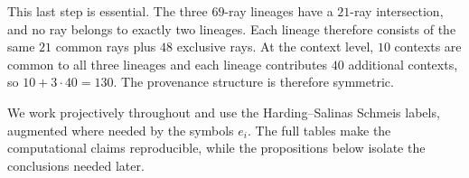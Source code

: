 \documentclass[%
  reprint,
  superscriptaddress,
  showpacs,
  showkeys,
  amsmath,amssymb,
  pra,
  longbibliography,
  floatfix,
  x11names
]{revtex4-2}
\newenvironment{revision}{\begingroup}{\endgroup}
\begin{document}
\begin{revision}
This last step is essential.  The three $69$-ray lineages have a $21$-ray intersection, and no ray belongs to exactly two lineages.  Each lineage therefore consists of the same $21$ common rays plus $48$ exclusive rays.  At the context level, $10$ contexts are common to all three lineages and each lineage contributes $40$ additional contexts, so $10+3\cdot40=130$.  The provenance structure is therefore symmetric.

We work projectively throughout and use the Harding--Salinas Schmeis labels, augmented where needed by the symbols $e_i$.  The full tables make the computational claims reproducible, while the propositions below isolate the conclusions needed later.
\end{revision}



\begin{figure}[ht]
\centering
{}
\end{figure}
\end{document}
